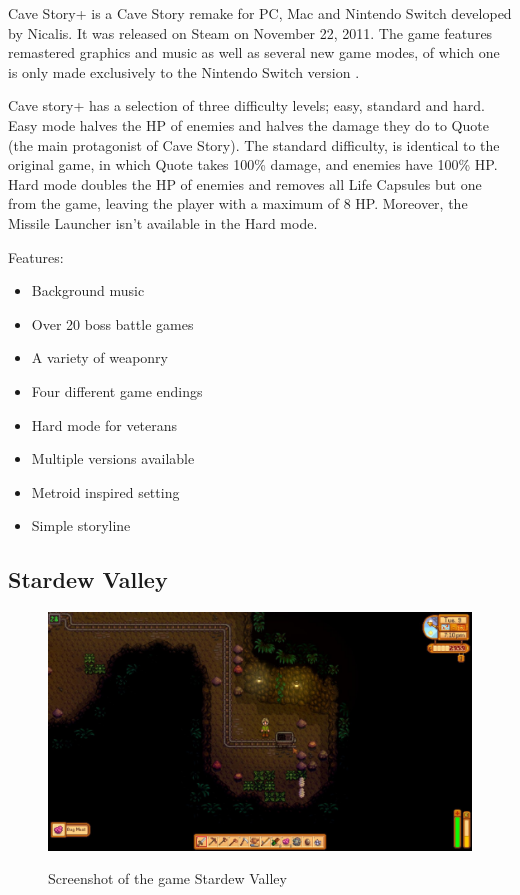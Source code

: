 \documentclass[12p]{article}
\begin{document}
Cave Story+ is a Cave Story remake for PC, Mac and Nintendo Switch developed by Nicalis. It was released on Steam on November 22, 2011. The game features remastered graphics and music as well as several new game modes, of which one is only made exclusively to the Nintendo Switch version \cite{CaveStoryPlusWiki}.

Cave story+ has a selection of three difficulty levels; easy, standard and hard. Easy mode halves the HP of enemies and halves the damage they do to Quote (the main protagonist of Cave Story). The standard difficulty, is identical to the original game, in which Quote takes 100\% damage, and enemies have 100\% HP. Hard mode doubles the HP of enemies and removes all Life Capsules but one from the game, leaving the player with a maximum of 8 HP. Moreover, the Missile Launcher isn't available in the Hard mode.

Features:

\begin{itemize}
    \item Background music
    \item Over 20 boss battle games
    \item A variety of weaponry
    \item Four different game endings
    \item Hard mode for veterans
    \item Multiple versions available
    \item Metroid inspired setting
    \item Simple storyline
\end{itemize}


\subsection{Stardew Valley}

\begin{figure}[ht]
    \center
    \includegraphics[width=1\textwidth]{StateOfTheArtScreenshots/stardew_valley}
    \label{StateOfTheArt_Screenshots_StardewValley}
    \caption{Screenshot of the game Stardew Valley \cite{StardewValleyScreenshot}}
\end{figure}
\end{document}
